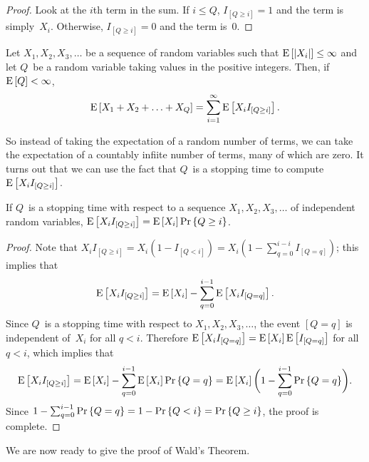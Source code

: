 \documentclass[11pt,twoside]{article}
\begin{document}
\begin{proof}
  Look at the $i$th term in the sum. If $i \leq Q$, $I_{[Q \geq i]}
  = 1$ and the term is simply~$X_i$. Otherwise, $I_{[Q \geq i]} = 0$
  and the term is~$0$.
\end{proof}
\begin{corollary}
  Let $X_1, X_2, X_3, \ldots$ be a sequence of random variables such
  that $\mathop{\textup{E}}\nolimits\left[\left|X_i\right|\right] \leq \infty$ and let $Q$~be a random variable
  taking values in the positive integers. Then, if $\mathop{\textup{E}}\nolimits\left[Q\right] < \infty$,
  \begin{displaymath}
    \mathop{\textup{E}}\nolimits\left[X_1 + X_2 + \ldots + X_Q\right]
    = \sum_{i=1}^{\infty} \mathop{\textup{E}}\nolimits\left[X_i I_{[Q \geq i]}\right].
  \end{displaymath}
\end{corollary}
So instead of taking the expectation of a random number of terms, we
can take the expectation of a countably infiite number of terms, many
of which are zero. It turns out that we can use the fact that $Q$~is a
stopping time to compute $\mathop{\textup{E}}\nolimits\left[X_i I_{[Q \geq i]}\right]$.
\begin{lemma}
  \label{lem:wald-independence}
  If $Q$~is a stopping time with respect to a sequence $X_1, X_2, X_3,
  \ldots$ of independent random variables, $\mathop{\textup{E}}\nolimits\left[X_i I_{[Q \geq i]}\right]
  = \mathop{\textup{E}}\nolimits\left[X_i\right] \mathop{\textup{Pr}}\nolimits\left\{Q \geq i\right\}$.
\end{lemma}
\begin{proof}
  Note that $X_i I_{[Q \geq i]} = X_i (1-I_{[Q < i]}) = X_i (1 -
  \sum_{q=0}^{i-i}I_{[Q = q]})$; this implies that
  \begin{displaymath}
    \mathop{\textup{E}}\nolimits\left[X_i I_{[Q \geq i]}\right] =
    \mathop{\textup{E}}\nolimits\left[X_i\right] - \sum_{q=0}^{i-1} \mathop{\textup{E}}\nolimits\left[X_i I_{[Q = q]}\right].
  \end{displaymath}
  Since $Q$~is a stopping time with respect to $X_1, X_2, X_3,
  \ldots$, the event $[Q = q]$ is independent of~$X_i$ for all $q <
  i$. Therefore $\mathop{\textup{E}}\nolimits\left[X_i I_{[Q = q]}\right] = \mathop{\textup{E}}\nolimits\left[X_i\right] \mathop{\textup{E}}\nolimits\left[I_{[Q = q]}\right]$
  for all $q < i$, which implies that
  \begin{displaymath}
    \mathop{\textup{E}}\nolimits\left[X_i I_{[Q \geq i]}\right] =
    \mathop{\textup{E}}\nolimits\left[X_i\right] - \sum_{q=0}^{i-1} \mathop{\textup{E}}\nolimits\left[X_i\right] \mathop{\textup{Pr}}\nolimits\left\{Q = q\right\} =
    \mathop{\textup{E}}\nolimits\left[X_i\right]\biggl(1 - \sum_{q=0}^{i-1} \mathop{\textup{Pr}}\nolimits\left\{Q = q\right\}\biggr).
  \end{displaymath}
  Since $1 - \sum_{q=0}^{i-1} \mathop{\textup{Pr}}\nolimits\left\{Q = q\right\} = 1 - \mathop{\textup{Pr}}\nolimits\left\{Q < i\right\} = \mathop{\textup{Pr}}\nolimits\left\{Q
  \geq i\right\}$, the proof is complete.
\end{proof}
We are now ready to give the proof of Wald's Theorem.
\end{document}
